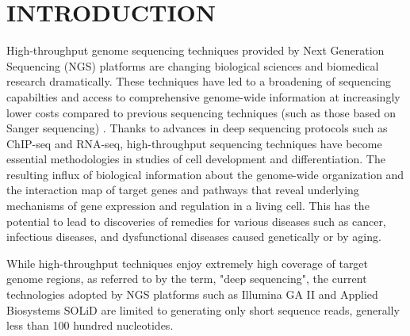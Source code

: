 \documentclass{acm_proc_article-sp}
\begin{document}

 


\section{INTRODUCTION} 

High-throughput genome sequencing techniques provided by Next
Generation Sequencing (NGS) platforms are changing biological sciences
and biomedical research dramatically.  These techniques have led to a
broadening of sequencing capabilties and access to comprehensive
genome-wide information at increasingly lower costs compared to
previous sequencing techniques (such as those based on Sanger
sequencing)
\cite{metzker2010,mardis2008-tig,mardis2008-arghg,gilad2009,mortazavi2008,sorek2010}.
Thanks to advances in deep sequencing protocols such as ChIP-seq and
RNA-seq, high-throughput sequencing techniques have become essential
methodologies in studies of cell development and
differentiation\cite{wang2009-natrevgen,pepke2009,gilad2009,mortazavi2008,sorek2010}.
The resulting influx of biological information about the genome-wide
organization and the interaction map of target genes and pathways that
reveal underlying mechanisms of gene expression and regulation in a
living cell. This has the potential to lead to discoveries of remedies
for various diseases such as cancer, infectious diseases, and
dysfunctional diseases caused genetically or by
aging\cite{amaral2008,encode2007,baek2008,costa2009}.


While high-throughput techniques enjoy extremely high coverage of
target genome regions, as referred to by the term, "deep sequencing",
the current technologies adopted by NGS platforms such as Illumina GA
II and Applied Biosystems SOLiD are limited to generating only short
sequence reads, generally less than 100 hundred
nucleotides\cite{metzker2010}.  
\end{document}
